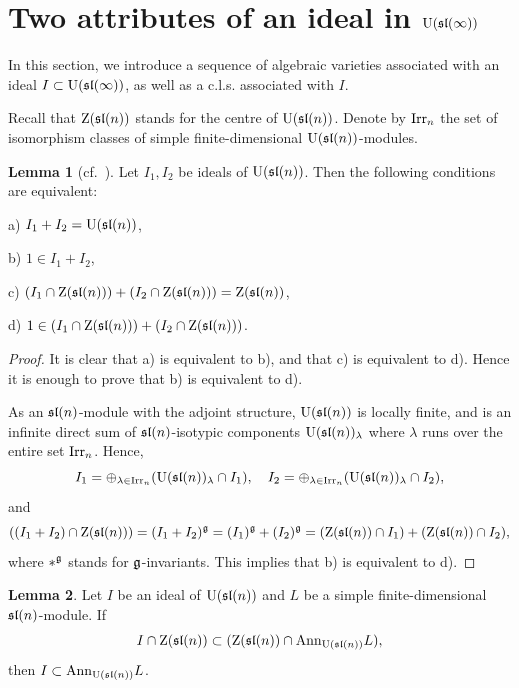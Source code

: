 \documentclass[10pt]{amsart}\oddsidemargin -1mm \evensidemargin -1mm \topmargin -15mm\headheight5mm \headsep 3.5mm \textheight 245mm\textwidth 170mm
\theoremstyle{definition}\newtheorem{theorem}{Theorem}[section]\newtheorem{lemma}[theorem]{Lemma}\newtheorem{remark}[theorem]{Remark}\newtheorem{proposition}[theorem]{Proposition}\newtheorem{corollary}[theorem]{Corollary}\newtheorem{definition}[theorem]{Definition}\newtheorem{Ex}[theorem]{Example}\newtheorem{obs}[theorem]{Observation}\newtheorem{nota}[theorem]{Notation}
\begin{document}
\section{Two attributes of an ideal in ${\rm U}(\frak{sl}(\infty))$}
In this section, we introduce a sequence of algebraic varieties associated with an ideal $I\subset{\rm U}(\frak{sl}(\infty))$, as well as a c.l.s. associated with $I$. 

Recall that ${\rm Z}(\frak{sl}(n))$ stands for the centre of ${\rm U}(\frak{sl}(n))$. 
Denote by ${\rm Irr}_n$ the set of isomorphism classes of simple finite-dimensional ${\rm U}(\frak{sl}(n))$-modules. 
\begin{lemma}[{cf.~\cite[Subsection~3.1]{BJ}}]\label{Lprebor} Let $I_1, I_2$ be ideals of ${\rm U}(\frak{sl}(n))$. 
Then the following conditions are equivalent:

a) $I_1+I_2={\rm U}(\frak{sl}(n))$,

b) $1\in I_1+I_2$,

c) $(I_1\cap {\rm Z}(\frak{sl}(n)))+(I_2\cap {\rm Z}(\frak{sl}(n)))={\rm Z}(\frak{sl}(n))$,

d) $1\in (I_1\cap {\rm Z}(\frak{sl}(n)))+(I_2\cap {\rm Z}(\frak{sl}(n)))$.\end{lemma}
\begin{proof}It is clear that a) is equivalent to b), and that c) is equivalent to d). 
Hence it is enough to prove that b) is equivalent to d).

As an $\frak{sl}(n)$-module with the adjoint structure, ${\rm U}(\frak{sl}(n))$ is locally finite, and is an infinite direct sum of $\frak{sl}(n)$-isotypic components ${\rm U}(\frak{sl}(n))_\lambda$ where $\lambda$ runs over the entire set ${\rm Irr}_n$. 
Hence, $$I_1=\oplus_{\lambda\in {\rm Irr}_n} ({\rm U}(\frak{sl}(n))_\lambda\cap I_1),\hspace{10pt}I_2=\oplus_{\lambda\in {\rm Irr}_n} ({\rm U}(\frak{sl}(n))_\lambda\cap I_2),$$
and 
$$((I_1+I_2)\cap {\rm Z}(\frak{sl}(n)))=(I_1+I_2)^\frak g=(I_1)^\frak g+(I_2)^\frak g=({\rm Z}(\frak{sl}(n))\cap I_1)+({\rm Z}(\frak{sl}(n))\cap I_2),$$
where $*^\frak g$ stands for $\frak g$-invariants. 
This implies that b) is equivalent to d).
\end{proof}
\begin{lemma}\label{Lbor}Let $I$ be an ideal of ${\rm U}(\frak{sl}(n))$ and $L$ be a simple finite-dimensional $\frak{sl}(n)$-module. 
If \begin{equation}I\cap {\rm Z}(\frak{sl}(n))\subset ({\rm Z}(\frak{sl}(n))\cap{\rm Ann}_{{\rm U}(\frak{sl}(n))}L),\label{Ebor}\end{equation} then $I\subset {\rm Ann}_{{\rm U}(\frak{sl}(n))}L$.\end{lemma}
\end{document}
